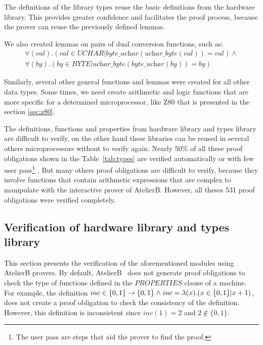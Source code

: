 \documentclass[a4paper]{llncs}
\begin{document}
The definitions of the library types reuse the basic definitions from
the hardware library. This provides greater confidence and facilitates
the proof process, because the prover can reuse the previously defined
lemmas.


%

We also created lemmas on pairs of dual conversion functions, such as:
$$
 \begin{array}{l}
  \forall (val) . (val \in \textit{UCHAR} |
  \textit{byte\_uchar}(\textit{uchar\_byte}(val)) = val) \land\\
  \forall (by) . (by \in \textit{BYTE} |
  \textit{uchar\_byte}(\textit{byte\_uchar}(by)) = by)
 \end{array}
$$

Similarly, several other general functions and lemmas were created for all other data types.
Some times, we need  create arithmetic and logic functions that are more specific for a
determined microprocessor, like Z80 that is presented in the section \ref{sec:z80}. 

The definitions, functions and properties from hardware library and types library are difficult to verify,
on the other hand  these libraries can be reused in several others  microprocessors without to verify again.
Nearly 50\% of all these proof obligations shown in the Table~\ref{tab:types} are verified automatically 
or with few user pass\footnote{The user pass are steps that aid the prover to find the proof.} .
But many others proof obligations are difficult to verify, because they involve functions
that contain arithmetic expressions that are complex to manipulate with the interactive
prover of AtelierB.  However, all theses 531 proof obligations were verified completely.


\subsection{Verification of hardware library and types library} 
\label{sec:VerificationHardwareLibrary}

This section presents the verification of the aforementioned modules
using AtelierB provers.  By default, AtelierB~\cite{atelierB} does not
generate proof obligations to check the type of functions defined in
the $PROPERTIES$ clause of a machine. For example, the definition $inc
\in \{0,1\} \fun \{0,1\} \land inc = \lambda(x).( x \in \{0,1\} | x +
1)$, does not create a proof obligation to check the consistency of
the definition. However, this definition is inconsistent since
$inc(1)=2$ and $ 2 \not\in \{0,1\}$.
\end{document}
